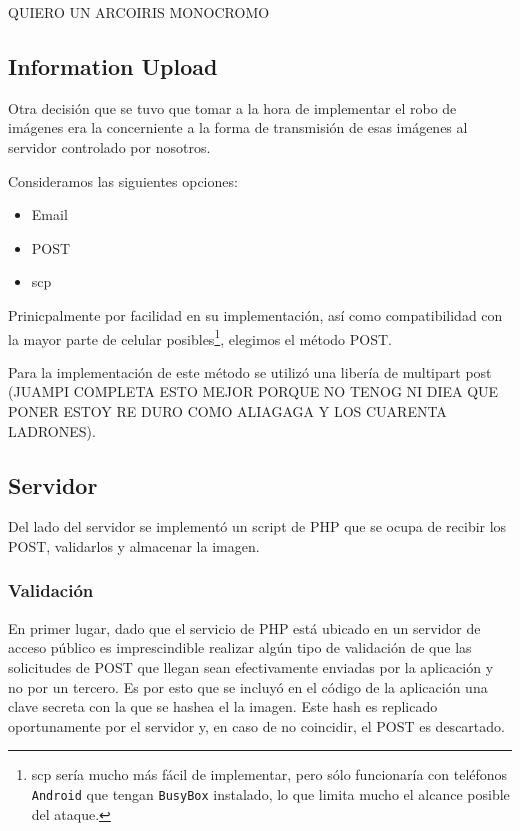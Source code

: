 \documentclass[10pt, a4paper,english,spanish]{article}
\begin{document}

QUIERO UN ARCOIRIS MONOCROMO
\subsection{Information Upload} %
\label{sub:Information Upload}
Otra decisión que se tuvo que tomar a la hora de implementar el robo de imágenes era la concerniente a la forma de transmisión de esas imágenes al servidor controlado por nosotros. 

Consideramos las siguientes opciones:
\begin{itemize}
	\item Email
	\item POST
	\item scp
\end{itemize}


Prinicpalmente por facilidad en su implementación, así como compatibilidad con la mayor parte de celular posibles\footnote{scp sería mucho más fácil de implementar, pero sólo funcionaría con teléfonos \texttt{Android} que tengan \texttt{BusyBox} instalado, lo que limita mucho el alcance posible del ataque.}, elegimos el método POST.

Para la implementación de este método se utilizó una libería de multipart post (JUAMPI COMPLETA ESTO MEJOR PORQUE NO TENOG NI DIEA QUE PONER ESTOY RE DURO COMO ALIAGAGA Y LOS CUARENTA LADRONES).


\subsection{Servidor} %
\label{sub:Servidor}
Del lado del servidor se implementó un script de PHP que se ocupa de recibir los POST, validarlos y almacenar la imagen.

\subsubsection{Validación} %
En primer lugar, dado que el servicio de PHP está ubicado en un servidor de acceso público es imprescindible realizar algún tipo de validación de que las solicitudes de POST que llegan sean efectivamente enviadas por la aplicación y no por un tercero. Es por esto que se incluyó en el código de la aplicación una clave secreta con la que se hashea el la imagen. Este hash es replicado oportunamente por el servidor y, en caso de no coincidir, el POST es descartado.
\label{subsub:Validación}
\end{document}
